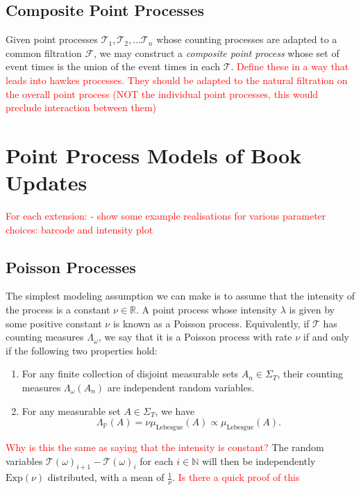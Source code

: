 \documentclass[honours,12pt]{unswthesis}
\numberwithin{equation}{section}
\begin{document}

\subsection{Composite Point Processes}
Given point processes $\mathcal{T}_1, \mathcal{T}_2, \ldots \mathcal{T}_n$ whose counting processes are adapted to a common filtration $\mathcal{F}$, we may construct a \textit{composite point process} whose set of event times is the union of the event times in each $\mathcal{T}$.
\textcolor{red}{Define these in a way that leads into hawkes processes. They should be adapted to the natural filtration on the overall point process (NOT the individual point processes, this would preclude interaction between them)}

\section{Point Process Models of Book Updates}

\textcolor{red}{
For each extension:
- show some example realisations for various parameter choices: barcode and intensity plot
}


\subsection{Poisson Processes}
The simplest modeling assumption we can make is to assume that the intensity of the process is a constant $\nu\in\mathbb{R}$. A point process  whose intensity $\lambda$ is given by some positive constant $\nu$ is known as a Poisson process. Equivalently, if $\mathcal{T}$ has counting measures $\Lambda_\omega$, we say that it is a Poisson process with rate $\nu$ if and only if the following two properties hold:
\begin{enumerate}
	\item For any finite collection of disjoint measurable sets $A_n\in\Sigma_T$, their counting measures $\Lambda_\omega(A_n)$ are independent random variables.
	\item For any measurable set $A\in\Sigma_T$, we have $$\Lambda_{\mathbb P}(A) = \nu \mu_{\mathrm{Lebesgue}}(A)\propto\mu_{\mathrm{Lebesgue}}(A).$$
\end{enumerate}
\textcolor{red}{Why is this the same as saying that the intensity is constant?}
The random variables $\mathcal{T}(\omega)_{i+1}-\mathcal{T}(\omega)_i$ for each $i\in\mathbb{N}$ will then be independently $\mathrm{Exp}(\nu)$ distributed, with a mean of $\frac{1}{\nu}$. \textcolor{red}{Is there a quick proof of this}
\end{document}
